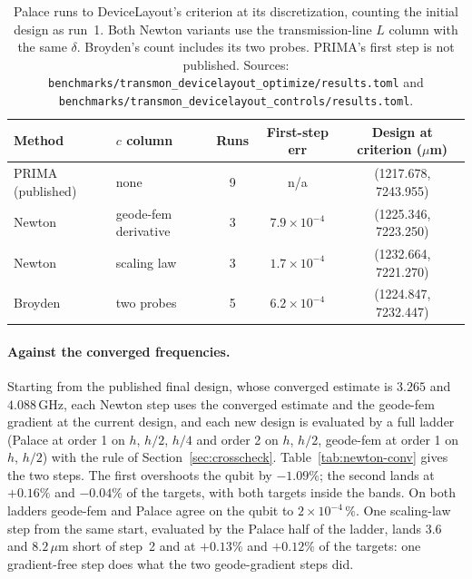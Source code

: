 \documentclass{anvil-paper}
\begin{document}
\begin{table}[htbp]
  \centering
  \caption{Palace runs to DeviceLayout's criterion at its discretization,
  counting the initial design as run~1. Both Newton variants use the
  transmission-line $L$ column with the same $\delta$. Broyden's count
  includes its two probes. PRIMA's first step is not published. Sources:
  \texttt{benchmarks/transmon\_devicelayout\_optimize/results.toml} and
  \texttt{benchmarks/transmon\_devicelayout\_controls/results.toml}.}
  \label{tab:controls}
  \small
  \begin{tabular}{@{}llccc@{}}
    \toprule
    Method & $c$ column & Runs & First-step err & Design at criterion ($\mu$m) \\
    \midrule
    PRIMA (published) & none & 9 & n/a & (1217.678, 7243.955) \\
    Newton & geode-fem derivative & 3 & $7.9\times10^{-4}$ & (1225.346, 7223.250) \\
    Newton & scaling law & 3 & $1.7\times10^{-4}$ & (1232.664, 7221.270) \\
    Broyden & two probes & 5 & $6.2\times10^{-4}$ & (1224.847, 7232.447) \\
    \bottomrule
  \end{tabular}
\end{table}

\paragraph{Against the converged frequencies.}
Starting from the published final design, whose converged estimate is
$3.265$ and $4.088$\,GHz, each Newton step uses the converged estimate and
the geode-fem gradient at the current design, and each new design is
evaluated by a full ladder (Palace at order 1 on $h$, $h/2$, $h/4$ and order
2 on $h$, $h/2$, geode-fem at order 1 on $h$, $h/2$) with the rule of
Section~\ref{sec:crosscheck}. Table~\ref{tab:newton-conv} gives the two
steps. The first overshoots the qubit by $-1.09\%$; the second lands at
$+0.16\%$ and $-0.04\%$ of the targets, with both targets inside the
bands. On both ladders geode-fem and Palace agree on the qubit to
$2\times10^{-4}\,\%$. One scaling-law step from the same start, evaluated by
the Palace half of the ladder, lands $3.6$ and $8.2\,\mu$m short of step~2
and at $+0.13\%$ and $+0.12\%$ of the targets: one gradient-free step does
what the two geode-gradient steps did.
\end{document}
